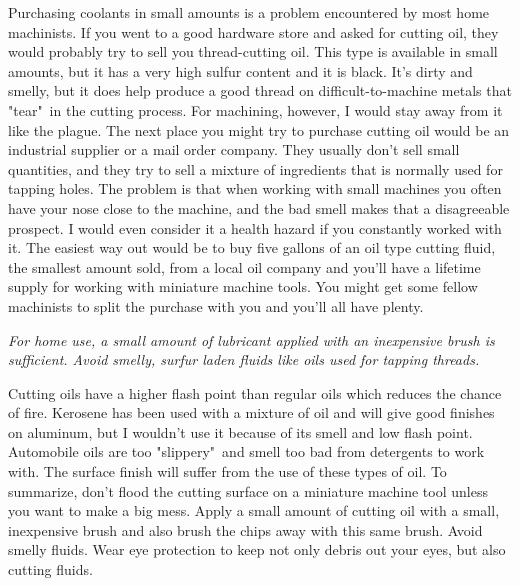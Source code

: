 
Purchasing coolants in small amounts is a problem encountered by most home
machinists. If you went to a good hardware store and asked for cutting oil, they
would probably try to sell you thread-cutting oil. This type is available in
small amounts, but it has a very high sulfur content and it is black. It's dirty
and smelly, but it does help produce a good thread on difficult-to-machine
metals that "tear"\ in the cutting process. For machining, however, I would stay
away from it like the plague. The next place you might try to purchase cutting
oil would be an industrial supplier or a mail order company. They usually don't
sell small quantities, and they try to sell a mixture of ingredients that is normally used for
tapping holes. The problem is that when working with small machines you often
have your nose close to the machine, and the bad smell makes that a disagreeable
prospect. I would even consider it a health hazard if you constantly worked with
it. The easiest way out would be to buy five gallons of an oil type cutting
fluid, the smallest amount sold, from a local oil company and you'll have a
lifetime supply for working with miniature machine tools. You might get some
fellow machinists to split the purchase with you and you'll all have plenty.

\bigskip
\textit{For home use, a small amount of lubricant applied with an inexpensive
brush is sufficient. Avoid smelly, surfur laden fluids like oils used for
tapping threads.}
\bigskip


Cutting oils have a higher flash point than regular oils which reduces the
chance of fire. Kerosene has been used with a mixture of oil and will give good
finishes on aluminum, but I wouldn't use it because of its smell and low flash
point. Automobile oils are too "slippery"\ and smell too bad from detergents to
work with. The surface finish will suffer from the use of these types of oil. To
summarize, don't flood the cutting surface on a miniature machine tool unless
you want to make a big mess. Apply a small amount of cutting oil with a small,
inexpensive brush and also brush the chips away with this same brush. Avoid
smelly fluids. Wear eye protection to keep not only debris out your eyes, but
also cutting fluids.

\secup
